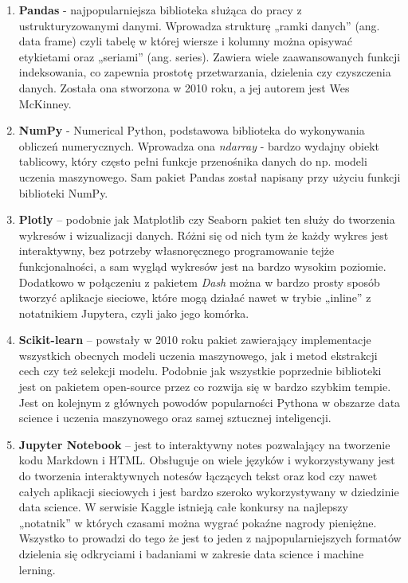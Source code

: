 \documentclass[a4paper,12pt,oneside]{book}
\begin{document}
\begin{enumerate}
    \item \textbf{Pandas} - najpopularniejsza biblioteka służąca do pracy z ustrukturyzowanymi danymi. Wprowadza strukturę „ramki danych” (ang. data frame) czyli tabelę w której wiersze i kolumny można opisywać etykietami oraz „seriami” (ang. series). Zawiera wiele zaawansowanych funkcji indeksowania, co zapewnia prostotę przetwarzania, dzielenia czy czyszczenia danych. Została ona stworzona w 2010 roku, a jej autorem jest Wes McKinney.
    \item \textbf{NumPy} - Numerical Python, podstawowa biblioteka do wykonywania obliczeń numerycznych. Wprowadza ona \textit{ndarray} - bardzo wydajny obiekt tablicowy, który często pełni funkcje przenośnika danych do np. modeli uczenia maszynowego. Sam pakiet Pandas został napisany przy użyciu funkcji biblioteki NumPy.
    \item \textbf{Plotly} – podobnie jak Matplotlib czy Seaborn pakiet ten służy do tworzenia wykresów i wizualizacji danych. Różni się od nich tym że każdy wykres jest interaktywny, bez potrzeby własnoręcznego programowanie tejże funkcjonalności, a sam wygląd wykresów jest na bardzo wysokim poziomie. Dodatkowo w połączeniu z pakietem \textit{Dash} można w bardzo prosty sposób tworzyć aplikacje sieciowe, które mogą działać nawet w trybie „inline” z notatnikiem Jupytera, czyli jako jego komórka.
    \item \textbf{Scikit-learn} – powstały w 2010 roku pakiet zawierający implementacje wszystkich obecnych modeli uczenia maszynowego, jak i metod ekstrakcji cech czy też selekcji modelu. Podobnie jak wszystkie poprzednie biblioteki jest on pakietem open-source przez co rozwija się w bardzo szybkim tempie. Jest on kolejnym z głównych powodów popularności Pythona w obszarze data science i uczenia maszynowego oraz samej sztucznej inteligencji.
    \item \textbf{Jupyter Notebook} – jest to interaktywny notes pozwalający na tworzenie kodu Markdown i HTML. Obsługuje on wiele języków i wykorzystywany jest do tworzenia interaktywnych notesów łączących tekst oraz kod czy nawet całych aplikacji sieciowych i jest bardzo szeroko wykorzystywany w dziedzinie data science. W serwisie Kaggle istnieją całe konkursy na najlepszy „notatnik” w których czasami można wygrać pokaźne nagrody pieniężne. Wszystko to prowadzi do tego że jest to jeden z najpopularniejszych formatów dzielenia się odkryciami i badaniami w zakresie data science i machine lerning.
\end{enumerate}
\end{document}

